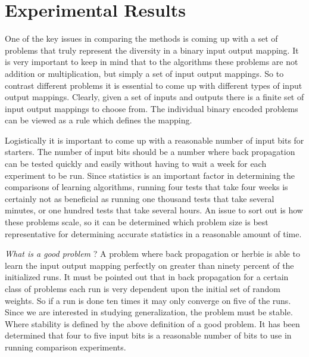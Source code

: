 \parskip 0.20in
\textheight 8.75in
\textwidth 6.0in
\topmargin -0.25in
\oddsidemargin 0.40in


\baselineskip 0.30in

\setcounter{chapter}{4}
\setcounter{page}{24}

\chapter{Experimental Results}
	
	One of the key issues in comparing the methods is coming up
with a set of problems that truly represent the diversity in a binary
input output mapping.  It is very important to keep in mind that to
the algorithms these problems are not addition or multiplication, but
simply a set of input output mappings.  So to contrast different
problems it is essential to come up with different types of input
output mappings.  Clearly, given a set of inputs and outputs there is
a finite set of input output mappings to choose from.  The individual
binary encoded problems can be viewed as a rule which defines the
mapping.

	Logistically it is important to come up with a reasonable
number of input bits for starters.  The number of input bits should be
a number where back propagation can be tested quickly and easily
without having to wait a week for each experiment to be run.  Since
statistics is an important factor in determining the comparisons of
learning algorithms, running four tests that take four weeks is
certainly not as beneficial as running one thousand tests that take
several minutes, or one hundred tests that take several hours.  An
issue to sort out is how these problems scale, so it can be determined
which problem size is best representative for determining accurate
statistics in a reasonable amount of time.

	{\it What is a good problem} ?  A problem where back
propagation or herbie is able to learn the input output mapping
perfectly on greater than ninety percent of the initialized runs.  It
must be pointed out that in back propagation for a certain class of
problems each run is very dependent upon the initial set of random
weights.  So if a run is done ten times it may only converge on five
of the runs.  Since we are interested in studying generalization, the
problem must be stable.  Where stability is defined by the above
definition of a good problem.  It has been determined that four to
five input bits is a reasonable number of bits to use in running
comparison experiments.

